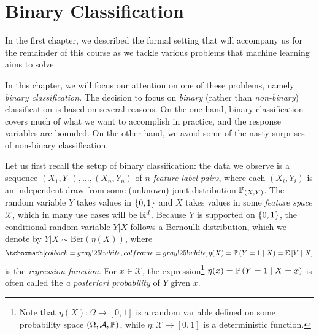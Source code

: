 \chapter{Binary Classification}

In the first chapter, we described the formal setting that will accompany us for the remainder of this course as we tackle various problems that machine learning aims to solve.

In this chapter, we will focus our attention on one of these problems, namely \emph{binary classification}. The decision to focus on \emph{binary} (rather than \emph{non-binary}) classification is based on several reasons. On the one hand, binary classification covers much of what we want to accomplish in practice, and the response variables are bounded. On the other hand, we avoid some of the nasty surprises of non-binary classification.

Let us first recall the setup of binary classification: the data we observe is a sequence $(X_1, Y_1), \dots, (X_n, Y_n)$ of $n$ \emph{feature-label pairs}, where each $(X_i, Y_i)$ is an independent draw from some (unknown) joint distribution $\P_{(X, Y)}$. The random variable $Y$ takes values in $\set{0, 1}$ and $X$ takes values in some \emph{feature space} $\mathcal{X}$, which in many use cases will be $\R^d$. Because $Y$ is supported on $\set{0, 1}$, the conditional random variable $Y \vert X$ follows a Bernoulli distribution, which we denote by $Y \vert X \sim \mathrm{Ber}(\eta(X))$, where
\[
    \highlightMath{
        \eta(X) = \Pr{Y = 1 \given X} = \Ex{Y \given X}
    }
\]
is the \emph{regression function}. For $x \in \mathcal{X}$, the expression\footnote{Note that $\eta(X) \colon \Omega \to [0, 1]$ is a random variable defined on some probability space $(\Omega, \mathcal{A}, \P)$, while $\eta \colon \mathcal{X} \to [0, 1]$ is a deterministic function.} $\eta(x) = \Pr{Y = 1 \given X = x}$ is often called the \emph{a posteriori probability} of $Y$ given $x$. 

